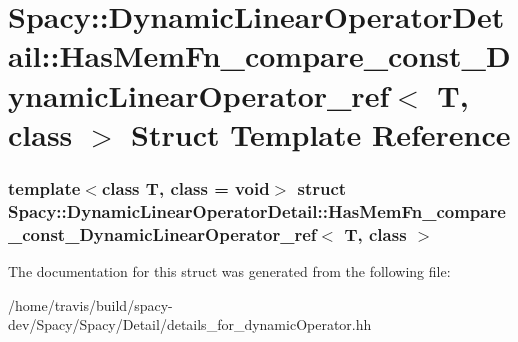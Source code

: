 \hypertarget{structSpacy_1_1DynamicLinearOperatorDetail_1_1HasMemFn__compare__const__DynamicLinearOperator__ref}{\section{\-Spacy\-:\-:\-Dynamic\-Linear\-Operator\-Detail\-:\-:\-Has\-Mem\-Fn\-\_\-compare\-\_\-const\-\_\-\-Dynamic\-Linear\-Operator\-\_\-ref$<$ \-T, class $>$ \-Struct \-Template \-Reference}
\label{structSpacy_1_1DynamicLinearOperatorDetail_1_1HasMemFn__compare__const__DynamicLinearOperator__ref}
}
\subsubsection*{template$<$class T, class = void$>$ struct Spacy\-::\-Dynamic\-Linear\-Operator\-Detail\-::\-Has\-Mem\-Fn\-\_\-compare\-\_\-const\-\_\-\-Dynamic\-Linear\-Operator\-\_\-ref$<$ T, class $>$}



\-The documentation for this struct was generated from the following file\-:\begin{DoxyCompactItemize}
\item 
/home/travis/build/spacy-\/dev/\-Spacy/\-Spacy/\-Detail/details\-\_\-for\-\_\-dynamic\-Operator.\-hh\end{DoxyCompactItemize}
